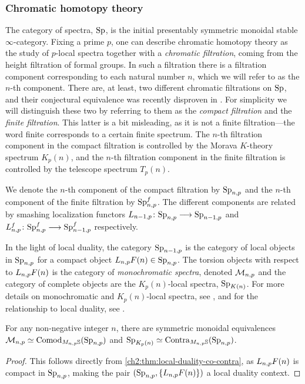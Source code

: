 \subsubsection*{Chromatic homotopy theory}

The category of spectra, $\mathrm{Sp}$, is the initial presentably symmetric monoidal stable $\infty$-category. Fixing a prime $p$, one can describe chromatic homotopy theory as the study of $p$-local spectra together with a \emph{chromatic filtration}, coming from the height filtration of formal groups. In such a filtration there is a filtration component corresponding to each natural number $n$, which we will refer to as the $n$-th component. There are, at least, two different chromatic filtrations on $\mathrm{Sp}$, and their conjectural equivalence was recently disproven in \cite{burklund-hahn-levy-schlank_23}. For simplicity we will distinguish these two by referring to them as the \emph{compact filtration} and the \emph{finite filtration}. This latter is a bit misleading, as it is not a finite filtration---the word finite corresponds to a certain finite spectrum. The $n$-th filtration component in the compact filtration is controlled by the Morava $K$-theory spectrum $K_p(n)$, and the $n$-th filtration component in the finite filtration is controlled by the telescope spectrum $T_p(n)$. 

We denote the $n$-th component of the compact filtration by $\mathrm{Sp}_{n,p}$ and the $n$-th component of the finite filtration by $\mathrm{Sp}_{n,p}^f$. The different components are related by smashing localization functors $L_{n-1,p}\colon\mathrm{Sp}_{n,p} \longrightarrow \mathrm{Sp}_{n-1,p}$ and $L_{n,p}^f\colon \mathrm{Sp}_{n,p}^f \longrightarrow \mathrm{Sp}_{n-1,p}^f$ respectively. 

In the light of local duality, the category $\mathrm{Sp}_{n-1,p}$ is the category of local objects in $\mathrm{Sp}_{n,p}$ for a compact object $L_{n,p} F(n) \in \mathrm{Sp}_{n,p}$. The torsion objects with respect to $L_{n,p} F(n)$ is the category of \emph{monochromatic spectra}, denoted $\mathcal{M}_{n,p}$ and the category of complete objects are the $K_p(n)$-local spectra, $\mathrm{Sp}_{{K(n)}}$. For more details on monochromatic and $K_p(n)$-local spectra, see \cite{hovey-strickland_99}, and for the relationship to local duality, see \cite[Section 6.2]{barthel-heard-valenzuela_2018}. 

\begin{proposition}
    For any non-negative integer $n$, there are symmetric monoidal equivalences $\mathcal{M}_{n,p} \simeq \mathrm{Comod}_{M_{n,p}\mathbb{S}}(\mathrm{Sp}_{n,p})$ and $\mathrm{Sp}_{{K_p(n)}}\simeq \mathrm{Contra}_{M_{n,p}\mathbb{S}}(\mathrm{Sp}_{n,p})$.
\end{proposition}
\begin{proof}
    This follows directly from \cref{ch2:thm:local-duality-co-contra}, as $L_{n,p} F(n)$ is compact in $\mathrm{Sp}_{n,p}$, making the pair $(\mathrm{Sp}_{n,p}, \{L_{n,p} F(n)\})$ a local duality context. 
\end{proof}

